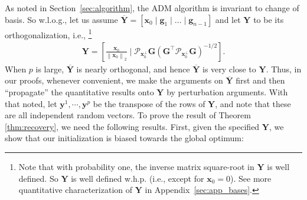 \documentclass[11pt, journal, final]{IEEEtran}
\numberwithin{equation}{section}
\newcommand{\mb}{\mathbf}
\newcommand{\mc}{\mathcal}
\newcommand{\norm}[1]{\left\lVert#1\right\rVert}
\newcommand{\ol}{\overline}
\newcommand{ \brac }[1]{\left[ #1 \right]}
\newcommand{ \paren }[1]{ \left( #1 \right) }
\begin{document}
{As noted in Section~\ref{sec:algorithm}, the ADM algorithm is invariant to change of basis. So w.l.o.g., let us assume
$\overline{\mb Y} = \brac{\mb x_0\mid \mb g_1\mid \dots \mid \mb g_{n-1} }$ and let $\mb Y$ to be its orthogonalization, i.e., \footnote{Note that with probability one, the inverse matrix square-root in $\mb Y$ is well defined. So $\mb Y$ is well defined w.h.p. (i.e., except for $\mb x_0 = 0$). See more quantitative characterization of $\mb Y$ in Appendix~\ref{sec:app_bases}. }
\begin{align} \label{eqn:Y_orth}
\mb Y = \brac{\frac{\mb x_0}{\norm{\mb x_0}_2} \mid \mc P_{\mb x_0^\perp} \mb G\paren{\mb G^\top \mc P_{\mb x_0^{\perp}} \mb G}^{-1/2} }.
\end{align}
When $p$ is large, $\overline{\mb Y}$ is nearly orthogonal, and hence $\ol{\mb Y}$ is very close to $\mb Y$. Thus, in our proofs, whenever convenient, we make the arguments on $\ol{\mb Y}$ first and then ``propagate'' the quantitative results onto $\mb Y$ by perturbation arguments. With that noted, let $\mb y^1,\cdots,\mb y^p$ be the transpose of the rows of $\mb Y$, and note that these are all independent random vectors. To prove the result of Theorem \ref{thm:recovery}, we need the following results. First, given the specified $\mb Y$, we show that our initialization is biased towards the global optimum:

}
\end{document}
